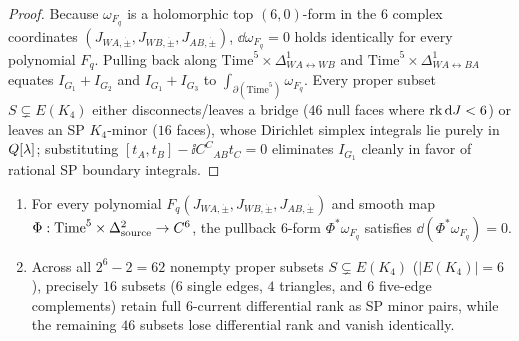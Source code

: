 \begin{proof}
Because $\omega_{F_q}$ is a holomorphic top $(6,0)$-form in the $6$ complex coordinates $(J_{WA,\dot{\pm}}, \allowbreak J_{WB,\dot{\pm}}, \allowbreak J_{AB,\dot{\pm}})$, $\dd\omega_{F_q} = 0$ holds identically for every polynomial $F_q$. Pulling back along $\mathrm{Time}^5\times\allowbreak\Delta^1_{WA\leftrightarrow WB}$ and $\mathrm{Time}^5\times\allowbreak\Delta^1_{WA\leftrightarrow BA}$ equates $I_{G_1}+I_{G_2}$ and $I_{G_1}+I_{G_3}$ to $\int_{\partial(\mathrm{Time}^5)}\omega_{F_q}$. Every proper subset $S \subsetneq E(K_4)$ either disconnects/leaves a bridge ($46$ null faces where $\operatorname{rk}\mathrm{d} J < 6$) or leaves an SP $K_4$-minor ($16$ faces), whose Dirichlet simplex integrals lie purely in $Q[\lambda]$; substituting $[t_A,t_B] - \ii C^C{}_{AB}t_C = 0$ eliminates $I_{G_1}$ cleanly in favor of rational SP boundary integrals.
\end{proof}

\begin{lemma}[{Closedness of $\Phi^*\omega_{F_q}$ and enumeration of all $62 = 46 + 16$ shrinking faces of $K_4$}]
\label{lem:k4-62-faces}
\leavevmode
\begin{enumerate}[label=(\arabic*),leftmargin=*]
  \item For every polynomial $F_q(J_{WA,\dot{\pm}}, J_{WB,\dot{\pm}}, J_{AB,\dot{\pm}})$ and smooth map $\Phi : \mathrm{Time}^5\times\Delta^2_{\mathrm{source}} \to C^6$, the pullback $6$-form $\Phi^*\omega_{F_q}$ satisfies $\dd(\Phi^*\omega_{F_q}) = 0$.

  \item Across all $2^6 - 2 = 62$ nonempty proper subsets $S \subsetneq E(K_4)$ ($|E(K_4)| = 6$), precisely $16$ subsets ($6$ single edges, $4$ triangles, and $6$ five-edge complements) retain full $6$-current differential rank as SP minor pairs, while the remaining $46$ subsets lose differential rank and vanish identically.
\end{enumerate}
\end{lemma}

